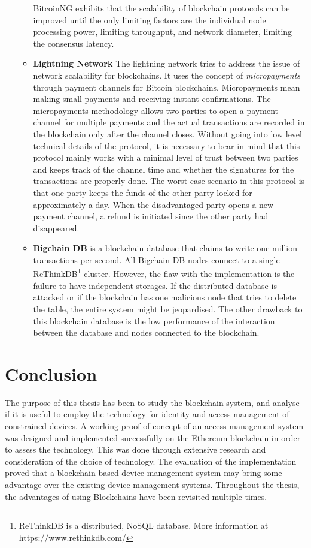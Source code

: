 \documentclass[english]{tktltiki}
\begin{document}
\begin{enumerate}
\begin{itemize}
BitcoinNG exhibits that the scalability of blockchain protocols can be improved until the only limiting factors are the individual node processing power, limiting throughput, and network diameter, limiting the consensus latency.

\item \textbf{Lightning Network}\cite{lightning}
The lightning network tries to address the issue of network scalability for blockchains. It uses the concept of \textit{micropayments} through payment channels for Bitcoin blockchains. Micropayments mean making small payments and receiving instant confirmations. The micropayments methodology allows two parties to open a payment channel for multiple payments and the actual transactions are recorded in the blockchain only after the channel closes. 
Without going into low level technical details of the protocol, it is necessary to bear in mind that this protocol mainly works with a minimal level of trust between two parties and keeps track of the channel time and whether the signatures for the transactions are properly done. The worst case scenario in this protocol is that one party keeps the funds of the other party locked for approximately a day. When the disadvantaged party opens a new payment channel, a refund is initiated since the other party had disappeared.  

\item \textbf{Bigchain DB} \cite{bigchaindb} is a blockchain database that claims to write one million transactions per second. All Bigchain DB nodes connect to a single ReThinkDB\footnote{ReThinkDB is a distributed, NoSQL database. More information at https://www.rethinkdb.com/} cluster. However, the flaw with the implementation is the failure to have independent storages. If the distributed database is attacked or if the blockchain has one malicious node that tries to delete the table, the entire system might be jeopardised. The other drawback to this blockchain database is the low performance of the interaction between the database and nodes connected to the blockchain.
\end{itemize}
  
\end{enumerate}
\newpage
\section{Conclusion}

The purpose of this thesis has been to study the blockchain system, and analyse if it is useful to employ the technology for identity and access management of constrained devices. A working proof of concept of an access management system was designed and implemented successfully on the Ethereum blockchain in order to assess the technology. This was done through extensive research and consideration of the choice of technology. The evaluation of the implementation proved that a blockchain based device management system may bring some advantage over the existing device management systems. Throughout the thesis, the advantages of using Blockchains have been revisited multiple times. 
\end{document}
